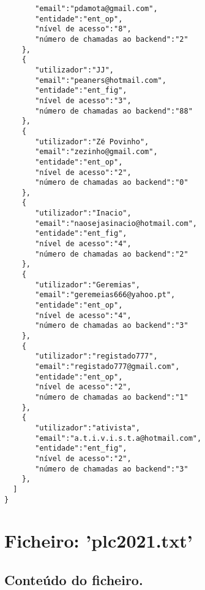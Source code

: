 \documentclass[11pt,a4paper]{report}%
\begin{document}
\begin{verbatim}
       "email":"pdamota@gmail.com",
       "entidade":"ent_op",
       "nível de acesso":"8",
       "número de chamadas ao backend":"2"
    },
    {
       "utilizador":"JJ",
       "email":"peaners@hotmail.com",
       "entidade":"ent_fig",
       "nível de acesso":"3",
       "número de chamadas ao backend":"88"
    },
    {
       "utilizador":"Zé Povinho",
       "email":"zezinho@gmail.com",
       "entidade":"ent_op",
       "nível de acesso":"2",
       "número de chamadas ao backend":"0"
    },
    {
       "utilizador":"Inacio",
       "email":"naosejasinacio@hotmail.com",
       "entidade":"ent_fig",
       "nível de acesso":"4",
       "número de chamadas ao backend":"2"
    },
    {
       "utilizador":"Geremias",
       "email":"geremeias666@yahoo.pt",
       "entidade":"ent_op",
       "nível de acesso":"4",
       "número de chamadas ao backend":"3"
    },
    {
       "utilizador":"registado777",
       "email":"registado777@gmail.com",
       "entidade":"ent_op",
       "nível de acesso":"2",
       "número de chamadas ao backend":"1"
    },
    {
       "utilizador":"ativista",
       "email":"a.t.i.v.i.s.t.a@hotmail.com",
       "entidade":"ent_fig",
       "nível de acesso":"2",
       "número de chamadas ao backend":"3"
    },
  ]
}
\end{verbatim}

\section{Ficheiro: 'plc2021.txt'}
\subsection{Conteúdo do ficheiro.}
\end{document}

